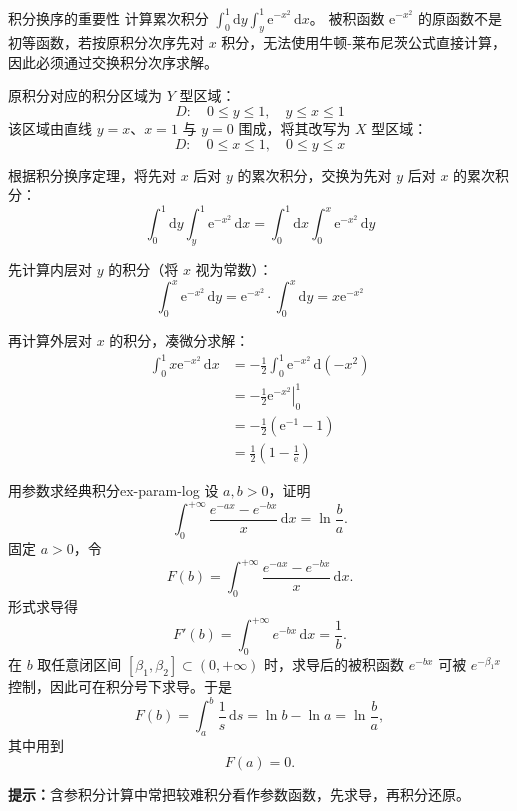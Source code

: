 \documentclass[UTF8,zihao=-4,openany]{ctexbook}
\begin{document}
\begin{example}{积分换序的重要性}{}
计算累次积分 $\displaystyle\int_{0}^{1} \mathrm{d}y \int_{y}^{1} \mathrm{e}^{-x^2} \, \mathrm{d}x$。
\tcblower
被积函数 $\mathrm{e}^{-x^2}$ 的原函数不是初等函数，若按原积分次序先对 $x$ 积分，无法使用牛顿-莱布尼茨公式直接计算，因此必须通过交换积分次序求解。

原积分对应的积分区域为 $Y$ 型区域：
$$
D: \quad 0 \le y \le 1,\quad y \le x \le 1
$$
该区域由直线 $y=x$、$x=1$ 与 $y=0$ 围成，将其改写为 $X$ 型区域：
$$
D: \quad 0 \le x \le 1,\quad 0 \le y \le x
$$

根据积分换序定理，将先对 $x$ 后对 $y$ 的累次积分，交换为先对 $y$ 后对 $x$ 的累次积分：
$$
\int_{0}^{1} \mathrm{d}y \int_{y}^{1} \mathrm{e}^{-x^2} \, \mathrm{d}x = \int_{0}^{1} \mathrm{d}x \int_{0}^{x} \mathrm{e}^{-x^2} \, \mathrm{d}y
$$

先计算内层对 $y$ 的积分（将 $x$ 视为常数）：
$$
\int_{0}^{x} \mathrm{e}^{-x^2} \, \mathrm{d}y = \mathrm{e}^{-x^2} \cdot \int_{0}^{x} \mathrm{d}y = x\mathrm{e}^{-x^2}
$$

再计算外层对 $x$ 的积分，凑微分求解：
$$
\begin{aligned}
\int_{0}^{1} x\mathrm{e}^{-x^2} \, \mathrm{d}x &= -\frac{1}{2}\int_{0}^{1} \mathrm{e}^{-x^2} \, \mathrm{d}(-x^2) \\
&= -\frac{1}{2}\left. \mathrm{e}^{-x^2} \right|_{0}^{1} \\
&= -\frac{1}{2}\left( \mathrm{e}^{-1} - 1 \right) \\
&= \frac{1}{2}\left( 1 - \frac{1}{\mathrm{e}} \right)
\end{aligned}
$$
\end{example}




\begin{example}{用参数求经典积分}{ex-param-log}
设 $a,b>0$，证明
\[
  \int_0^{+\infty}\frac{e^{-ax}-e^{-bx}}{x}\,\mathrm{d}x
  =
  \ln\frac ba.
\]
\tcblower
固定 $a>0$，令
\[
  F(b)=\int_0^{+\infty}\frac{e^{-ax}-e^{-bx}}{x}\,\mathrm{d}x.
\]
形式求导得
\[
  F'(b)=\int_0^{+\infty}e^{-bx}\,\mathrm{d}x=\frac1b.
\]
在 $b$ 取任意闭区间 $[\beta_1,\beta_2]\subset(0,+\infty)$ 时，求导后的被积函数 $e^{-bx}$ 可被 $e^{-\beta_1x}$ 控制，因此可在积分号下求导。于是
\[
  F(b)=\int_a^b \frac1s\,\mathrm{d}s=\ln b-\ln a=\ln\frac ba,
\]
其中用到
\[
  F(a)=0.
\]

\textbf{提示：}含参积分计算中常把较难积分看作参数函数，先求导，再积分还原。
\end{example}
\end{document}
